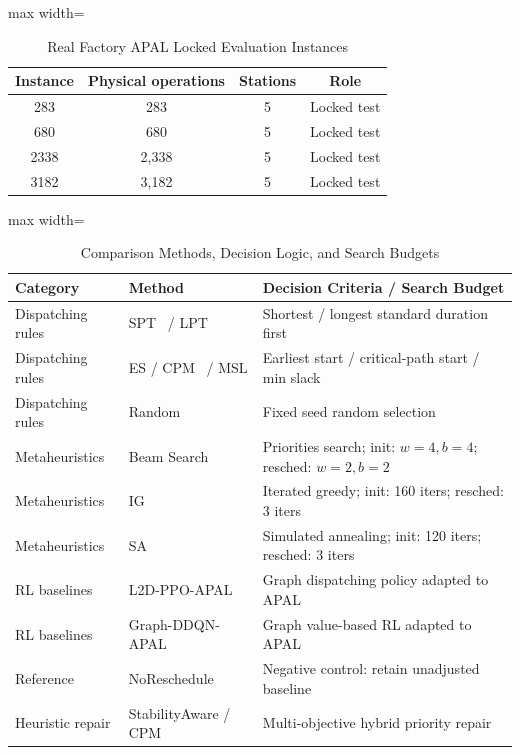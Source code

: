 \documentclass[journal,10pt]{IEEEtran}
\renewcommand{\arraystretch}{1.06}
\begin{document}
\begin{table}[!t]
\centering
\caption{Real Factory APAL Locked Evaluation Instances}
\label{tab:instances}
\setlength{\tabcolsep}{6pt}
\renewcommand{\arraystretch}{1.05}
\begin{adjustbox}{max width=\columnwidth}
\begin{tabular}{@{}cccc@{}}
\toprule
\textbf{Instance} & \textbf{Physical operations} & \textbf{Stations} & \textbf{Role} \\
\midrule
283 & 283 & 5 & Locked test \\
680 & 680 & 5 & Locked test \\
2338 & 2,338 & 5 & Locked test \\
3182 & 3,182 & 5 & Locked test \\
\bottomrule
\end{tabular}
\end{adjustbox}
\vspace{2pt}
\par{}\par
\end{table}

\begin{table}[!t]
\centering
\caption{Comparison Methods, Decision Logic, and Search Budgets}
\label{tab:baselines}
\setlength{\tabcolsep}{3pt}
\renewcommand{\arraystretch}{1.05}
\begin{adjustbox}{max width=\columnwidth}
\begin{tabular}{@{}lll@{}}
\toprule
\textbf{Category} & \textbf{Method} & \textbf{Decision Criteria / Search Budget} \\
\midrule
Dispatching rules & SPT~\cite{smith1956} / LPT & Shortest / longest standard duration first \\
Dispatching rules & ES / CPM~\cite{kelley1961} / MSL & Earliest start / critical-path start / min slack \\
Dispatching rules & Random & Fixed seed random selection \\
Metaheuristics & Beam Search~\cite{ow1988} & Priorities search; init: $w=4, b=4$; resched: $w=2, b=2$ \\
Metaheuristics & IG~\cite{ruiz2007} & Iterated greedy; init: 160 iters; resched: 3 iters \\
Metaheuristics & SA~\cite{kirkpatrick1983} & Simulated annealing; init: 120 iters; resched: 3 iters \\
RL baselines & L2D-PPO-APAL & Graph dispatching policy adapted to APAL \\
RL baselines & Graph-DDQN-APAL & Graph value-based RL adapted to APAL \\
Reference & NoReschedule & Negative control: retain unadjusted baseline \\
Heuristic repair & StabilityAware / CPM & Multi-objective hybrid priority repair \\
\bottomrule
\end{tabular}
\end{adjustbox}
\end{table}
\end{document}
